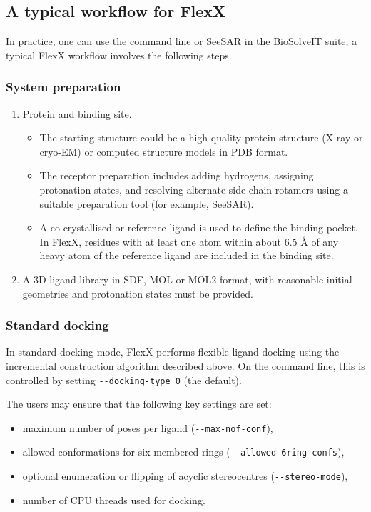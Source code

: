 \documentclass[12pt]{article}
\begin{document}
\subsection{A typical workflow for FlexX}

In practice, one can use the command line or SeeSAR in the BioSolveIT suite; a typical FlexX workflow involves the following steps.

\subsubsection{System preparation}

\begin{enumerate}
\item Protein and binding site.
\begin{itemize}
  \item The starting structure could be a high-quality protein structure (X-ray or cryo-EM) or computed structure models in PDB format.
  \item The receptor preparation includes adding hydrogens, assigning protonation states, and resolving alternate side-chain rotamers using a suitable preparation tool (for example, SeeSAR).
  \item A co-crystallised or reference ligand is used to define the binding pocket. In FlexX, residues with at least one atom within about 6.5 \r{A} of any heavy atom of the reference ligand are included in the binding site.
\end{itemize}

\item A 3D ligand library in SDF, MOL or MOL2 format, with reasonable initial geometries and protonation states must be provided.

\end{enumerate}

\subsubsection{Standard docking}
In standard docking mode, FlexX performs flexible ligand docking using the incremental construction algorithm described above. On the command line, this is controlled by setting \verb|--docking-type 0| (the default).

The users may ensure that the following key settings are set:
\begin{itemize}
  \item maximum number of poses per ligand (\verb|--max-nof-conf|),
  \item allowed conformations for six-membered rings (\verb|--allowed-6ring-confs|),
  \item optional enumeration or flipping of acyclic stereocentres (\verb|--stereo-mode|),
  \item number of CPU threads used for docking.
\end{itemize}
\end{document}
